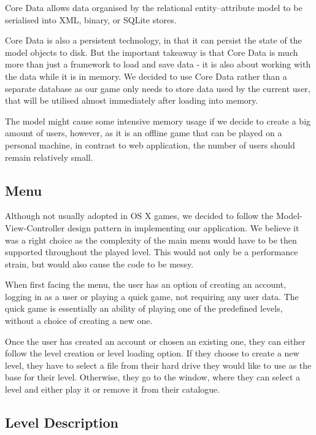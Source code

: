 Core Data allows data organised by the relational entity–attribute model to be serialised into XML, binary, or SQLite stores.

Core Data is also a persistent technology, in that it can persist the state of the model objects to disk. But the important takeaway is that Core Data is much more than just a framework to load and save data - it is also about working with the data while it is in memory.
We decided to use Core Data rather than a separate database as our game only needs to store data used by the current user, that will be utilised almost immediately after loading into memory. 
  
The model might cause some intensive memory usage if we decide to create a big amount of users, however, as it is an offline game that can be played on a personal machine, in contrast to web application, the number of users should remain relatively small.

\vspace{10pt}

\subsection{Menu}

Although not usually adopted in OS X games, we decided to follow the Model-View-Controller design pattern in implementing our application. We believe it was a right choice as the complexity of the main menu would have to be then supported throughout the played level. This would not only be a performance strain, but would also cause the code to be messy.

When first facing the menu, the user has an option of creating an account, logging in as a user or playing a quick game, not requiring any user data. 
The quick game is essentially an ability of playing one of the predefined levels, without a choice of creating a new one.

Once the user has created an account or chosen an existing one, they can either follow the level creation or level loading option. If they choose to create a new level, they have to select a file from their hard drive they would like to use as the base for their level. Otherwise, they go to the window, where they can select a level and either play it or remove it from their catalogue.

\vspace{10pt}

\subsection{Level Description}

